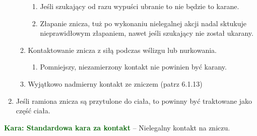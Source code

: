 \documentclass[11pt,a4paper]{article}
\newcommand\penaltyd[2]{\bgroup\textcolor{darkgreen}{\textbf{Kara: #1}} -- #2}
\begin{document}
\begin{enumerate}
\begin{enumerate}
    \begin{enumerate}
      \item Jeśli szukający od razu wypuści ubranie to nie będzie to karane.
      \item Złapanie znicza, tuż po wykonaniu nielegalnej akcji nadal sktukuje nieprawidłowym złapaniem, nawet jeśli szukający nie został ukarany.
    \end{enumerate}
    \item Kontaktowanie znicza z siłą podczas wślizgu lub nurkowania.
    \begin{enumerate}
      \item Pomniejszy, niezamierzony kontakt nie powinien być karany.
    \end{enumerate}
    \item Wyjątkowo nadmierny kontakt ze zniczem (patrz 6.1.13) %
  \end{enumerate}
  \item Jeśli ramiona znicza są przytulone do ciała, to powinny być traktowane jako część ciała.
\end{enumerate}

\penaltyd{Standardowa kara za kontakt}{Nielegalny kontakt na zniczu.}

%
%
%
%
%
%

\newpage
\end{document}
